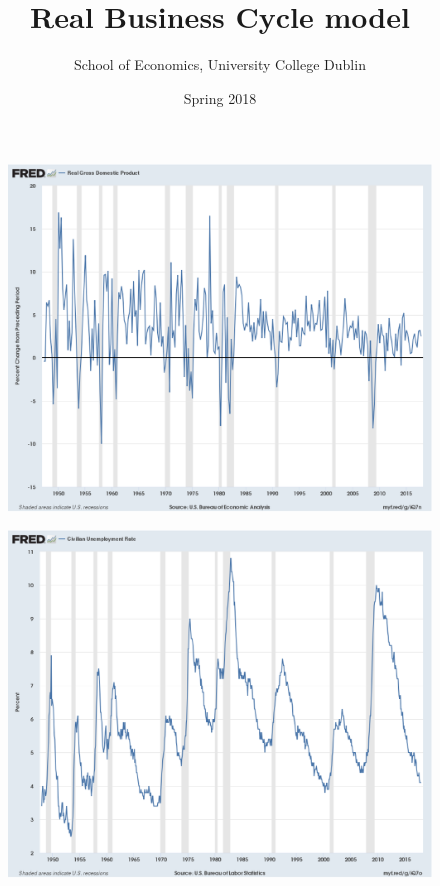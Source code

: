\documentclass{beamer}
\title{Real Business Cycle model}
\author{School of Economics, University College Dublin}
\date{Spring 2018}
\begin{document}
\begin{frame}
 \titlepage
\end{frame}

\begin{frame}
  \begin{figure}
    \includegraphics[scale=.25]{fred.eps}
  \end{figure}
\end{frame}

\begin{frame}
  \begin{figure}
    \includegraphics[scale=.25]{fred2.eps}
  \end{figure}
\end{frame}
\end{document}
